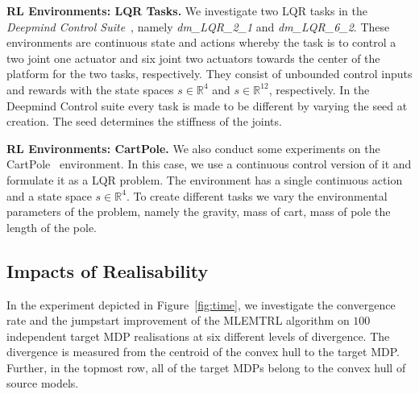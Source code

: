 
\noindent\textbf{RL Environments: LQR Tasks.}
We investigate two LQR tasks in the \emph{Deepmind Control Suite}~\citep{tassa2018deepmind}, namely \emph{dm\_LQR\_2\_1} and \emph{dm\_LQR\_6\_2}. These environments are continuous state and actions whereby the task is to control a two joint one actuator and six joint two actuators towards the center of the platform for the two tasks, respectively. They consist of unbounded control inputs and rewards with the state spaces $s \in \mathbb{R}^4$ and $s\in\mathbb{R}^{12}$, respectively. In the Deepmind Control suite every task is made to be different by varying the seed at creation. The seed determines the stiffness of the joints.


\noindent\textbf{RL Environments: CartPole.} We also conduct some experiments on the CartPole~\citep{barto1983neuronlike} environment. In this case, we use a continuous control version of it and formulate it as a LQR problem. The environment has a single continuous action and a state space $s \in \mathbb{R}^4$. To create different tasks we vary the environmental parameters of the problem, namely the gravity, mass of cart, mass of pole the length of the pole.

\subsection{Impacts of Realisability}
In the experiment depicted in Figure~\ref{fig:time}, we investigate the convergence rate and the jumpstart improvement of the MLEMTRL algorithm on $100$ independent target MDP realisations at six different levels of divergence. The divergence is measured from the centroid of the convex hull to the target MDP. Further, in the topmost row, all of the target MDPs belong to the convex hull of source models. 


